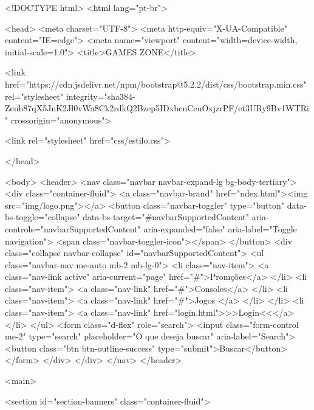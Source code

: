 <!DOCTYPE html>
<html lang="pt-br">

<head>
  <meta charset="UTF-8">
  <meta http-equiv="X-UA-Compatible" content="IE=edge">
  <meta name="viewport" content="width=device-width, initial-scale=1.0">
  <title>GAMES ZONE</title>

  <link href="https://cdn.jsdelivr.net/npm/bootstrap@5.2.2/dist/css/bootstrap.min.css" rel="stylesheet"
    integrity="sha384-Zenh87qX5JnK2Jl0vWa8Ck2rdkQ2Bzep5IDxbcnCeuOxjzrPF/et3URy9Bv1WTRi" crossorigin="anonymous">

  <link rel="stylesheet" href="css/estilo.css">



</head>

<body>
  <header>
    <nav class="navbar navbar-expand-lg bg-body-tertiary">
      <div class="container-fluid">
        <a class="navbar-brand" href="ndex.html"><img src="img/logo.png"></a>
        <button class="navbar-toggler" type="button" data-bs-toggle="collapse" data-bs-target="#navbarSupportedContent" aria-controls="navbarSupportedContent" aria-expanded="false" aria-label="Toggle navigation">
          <span class="navbar-toggler-icon"></span>
        </button>
        <div class="collapse navbar-collapse" id="navbarSupportedContent">
          <ul class="navbar-nav me-auto mb-2 mb-lg-0">
            <li class="nav-item">
              <a class="nav-link active" aria-current="page" href="#">Promções</a>
            </li>
            <li class="nav-item">
              <a class="nav-link" href="#">Consoles</a>
            </li>
            <li class="nav-item">
              <a class="nav-link" href="#">Jogos </a>
            </li>
           </li>
           <li class="nav-item">
            <a class="nav-link" href="login.html">>>Login<<</a>
           </li>
          </ul>
          <form class="d-flex" role="search">
            <input class="form-control me-2" type="search" placeholder="O que deseja buscar" aria-label="Search">
            <button class="btn btn-outline-success" type="submit">Buscar</button>
          </form>
        </div>
      </div>
    </nav>
  </header>

  <main>



    <section id="section-banners" class="container-fluid">

